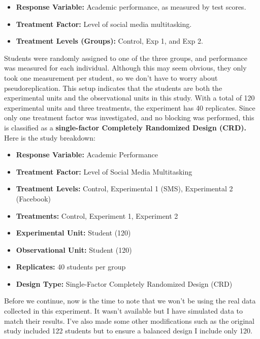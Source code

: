 \documentclass[
  letterpaper,
  DIV=11,
  numbers=noendperiod,
  oneside]{scrreprt}
\providecommand{\tightlist}{%
  \setlength{\itemsep}{0pt}\setlength{\parskip}{0pt}}\usepackage{longtable,booktabs,array}
\begin{document}
\begin{itemize}
\tightlist
\item
  \textbf{Response Variable:} Academic performance, as measured by test
  scores.
\item
  \textbf{Treatment Factor:} Level of social media multitasking.
\item
  \textbf{Treatment Levels (Groups):} Control, Exp 1, and Exp 2.
\end{itemize}

Students were randomly assigned to one of the three groups, and
performance was measured for each individual. Although this may seem
obvious, they only took one measurement per student, so we don't have to
worry about pseudoreplication. This setup indicates that the students
are both the experimental units and the observational units in this
study. With a total of 120 experimental units and three treatments, the
experiment has 40 replicates. Since only one treatment factor was
investigated, and no blocking was performed, this is classified as a
\textbf{single-factor Completely Randomized Design (CRD).} Here is the
study breakdown:

\begin{itemize}
\tightlist
\item
  \textbf{Response Variable:} Academic Performance\\
\item
  \textbf{Treatment Factor:} Level of Social Media Multitasking\\
\item
  \textbf{Treatment Levels:} Control, Experimental 1 (SMS), Experimental
  2 (Facebook)\\
\item
  \textbf{Treatments:} Control, Experiment 1, Experiment 2\\
\item
  \textbf{Experimental Unit:} Student (120)\\
\item
  \textbf{Observational Unit:} Student (120)\\
\item
  \textbf{Replicates:} 40 students per group\\
\item
  \textbf{Design Type:} Single-Factor Completely Randomized Design (CRD)
\end{itemize}

Before we continue, now is the time to note that we won't be using the
real data collected in this experiment. It wasn't available but I have
simulated data to match their results. I've also made some other
modifications such as the original study included 122 students but to
ensure a balanced design I include only 120.
\end{document}

